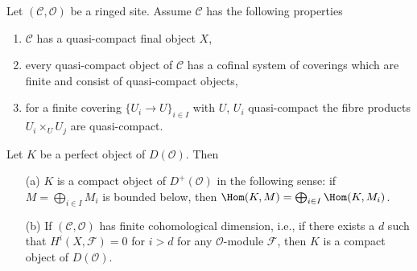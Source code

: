 \begin{lemma}
\label{lemma-perfect-is-compact}
Let $(\mathcal{C}, \mathcal{O})$ be a ringed site. Assume
$\mathcal{C}$ has the following properties
\begin{enumerate}
\item $\mathcal{C}$ has a quasi-compact final object $X$,
\item every quasi-compact object of $\mathcal{C}$
has a cofinal system of coverings which are finite
and consist of quasi-compact objects,
\item for a finite covering $\{U_i \to U\}_{i \in I}$
with $U$, $U_i$ quasi-compact the fibre products $U_i \times_U U_j$ are
quasi-compact.
\end{enumerate}
Let $K$ be a perfect object of $D(\mathcal{O})$. Then
\begin{enumerate}
\item[(a)] $K$ is a compact object of $D^+(\mathcal{O})$
in the following sense: if $M = \bigoplus_{i \in I} M_i$ is
bounded below, then $\Hom(K, M) = \bigoplus_{i \in I} \Hom(K, M_i)$.
\item[(b)] If $(\mathcal{C}, \mathcal{O})$
has finite cohomological dimension, i.e., if there exists
a $d$ such that $H^i(X, \mathcal{F}) = 0$ for $i > d$ for
any $\mathcal{O}$-module $\mathcal{F}$, then
$K$ is a compact object of $D(\mathcal{O})$.
\end{enumerate}
\end{lemma}

